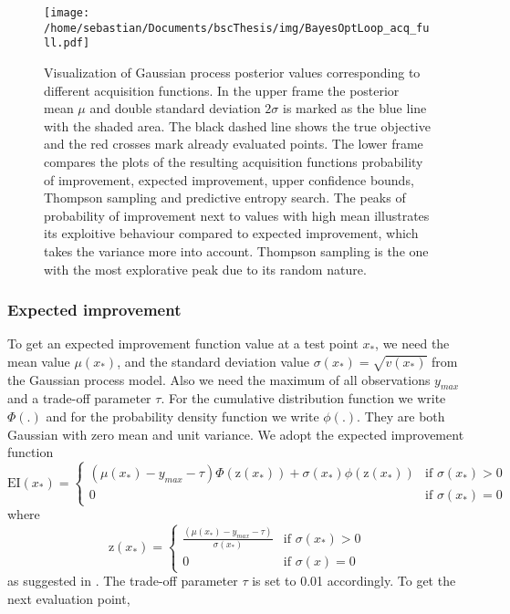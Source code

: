 \begin{figure}[h]
    \centering
    \texttt{[image: /home/sebastian/Documents/bscThesis/img/BayesOptLoop\_acq\_full.pdf]}
    \caption{Visualization of Gaussian process posterior values corresponding to different acquisition functions. In the upper frame the posterior mean $\mu$ and double standard deviation $2\sigma$ is marked as the blue line with the shaded area. The black dashed line shows the true objective and the red crosses mark already evaluated points. The lower frame compares the plots of the resulting acquisition functions probability of improvement, expected improvement, upper confidence bounds, Thompson sampling and predictive entropy search. The peaks of probability of improvement next to values with high mean illustrates its exploitive behaviour compared to expected improvement, which takes the variance more into account. Thompson sampling is the one with the most explorative peak due to its random nature. \cite{shahriari2016taking} \label{fig:acqFcn}}
\end{figure}

\subsubsection{Expected improvement}
To get an expected improvement function value at a test point $x_*$, we need the mean value $\mu(x_*)$, and the standard deviation value $\sigma(x_*) = \sqrt{v(x_*)}$ from the Gaussian process model. Also we need the maximum of all observations $y_{max}$ and a trade-off parameter $\tau$. For the cumulative distribution function we write $\Phi(.)$ and for the probability density function we write $\phi(.)$. They are both Gaussian with zero mean and unit variance. We adopt the expected improvement function
\[
    \mathrm{EI}(x_*)=
\begin{cases}
    (\mu(x_*) - y_{max} - \tau)\Phi(\mathrm{z}(x_*))+\sigma(x_*)\phi(\mathrm{z}(x_*))& \text{if } \sigma(x_*)> 0\\
    0 & \text{if } \sigma(x_*)= 0
\end{cases}
\]
where
\[
    \mathrm{z}(x_*)=
\begin{cases}
    \frac{(\mu(x_*) -y_{max} - \tau)}{\sigma(x_*)} & \text{if } \sigma(x_*)> 0\\
    0 & \text{if } \sigma(x)= 0
\end{cases}
\]
as suggested in \cite{brochu2010tutorial}. The trade-off parameter $\tau$ is set to 0.01 accordingly. To get the next evaluation point,

